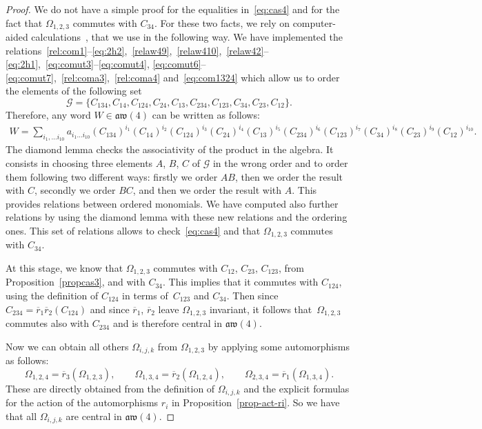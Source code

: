 \documentclass[pdftex]{sigma}
\numberwithin{equation}{section}
\newcommand{\cG}{\mathcal{G}}
\theoremstyle{definition}
\newcommand{\rb}{\overline{r}}
\begin{document}
\begin{proof}
We do not have a simple proof for the equalities in~\eqref{eq:cas4} and for the fact that $\varOmega_{1,2,3}$ commutes with $C_{34}$.
For these two facts, we rely on computer-aided calculations~\cite{form}, that we use in the following way.
We have implemented the relations~\eqref{rel:com1}--\eqref{eq:2h2},~\eqref{relaw49},~\eqref{relaw410},~\eqref{relaw42}--\eqref{eq:2h1},~\eqref{eq:comut3}--\eqref{eq:comut4},
\eqref{eq:comut6}--\eqref{eq:comut7},~\eqref{rel:coma3},~\eqref{rel:coma4} and~\eqref{eq:com1324} which allow us to order the elements of the following set
\[\cG=\{C_{134}, C_{14}, C_{124}, C_{24}, C_{13}, C_{234}, C_{123}, C_{34}, C_{23},C_{12}\}.\]
Therefore, any word $W\in \mathfrak{aw}(4)$ can be written as follows:
\begin{gather*}
 W\!= \!\!\!\sum_{i_1,\dots i_{10}}\!\!\! a_{i_1\dots i_{10} }(C_{134})^{i_1} (C_{14})^{i_2} (C_{124})^{i_3} (C_{24})^{i_4} (C_{13})^{i_5} (C_{234})^{i_6} (C_{123})^{i_7} (C_{34})^{i_8} (C_{23})^{i_9} (C_{12})^{i_{10}}.
\end{gather*}
The diamond lemma checks the associativity of the product in the algebra. It consists in choosing three elements $A$, $B$, $C$ of $\cG$ in the wrong order and to order them following two different ways:
firstly we order $AB$, then we order the result with $C$, secondly we order $BC$, and then we order the result with $A$.
This provides relations between ordered monomials. We have computed also further relations by using the diamond lemma with these new relations and the ordering ones.
This set of relations allows to check~\eqref{eq:cas4} and that $\varOmega_{1,2,3}$ commutes with $C_{34}$.


At this stage, we know that $\varOmega_{1,2,3}$ commutes with $C_{12}$, $C_{23}$, $C_{123}$, from Proposition~\ref{propcas3}, and with $C_{34}$. This implies that it commutes with $C_{124}$, using the definition of $C_{124}$ in terms of~$C_{123}$ and $C_{34}$. Then since $C_{234}=\rb_1\rb_2(C_{124})$ and since $\rb_1$, $\rb_2$ leave $\varOmega_{1,2,3}$ invariant, it follows that~$\varOmega_{1,2,3}$ commutes also with $C_{234}$
and is therefore central in $\mathfrak{aw}(4)$.

Now we can obtain all others $\varOmega_{i,j,k}$ from $\varOmega_{1,2,3}$ by applying some automorphisms as follows:
\[\varOmega_{1,2,4}=\rb_3(\varOmega_{1,2,3}) ,\qquad \varOmega_{1,3,4}=\rb_2(\varOmega_{1,2,4}) ,\qquad \varOmega_{2,3,4}=\rb_1(\varOmega_{1,3,4}) .\]
These are directly obtained from the definition of $\varOmega_{i,j,k}$ and the explicit formulas for the action of the automorphisms $r_i$ in Proposition~\ref{prop-act-ri}. So we have that all $\varOmega_{i,j,k}$ are central in $\mathfrak{aw}(4)$.


\end{proof}
\end{document}

